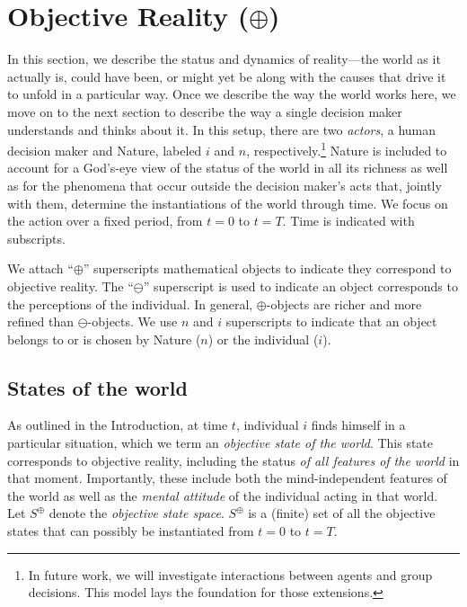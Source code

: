 \documentclass[
11pt,
titlepage,
reqno,
]{article}%
\theoremstyle{definition}
\begin{document}
	
\section{Objective Reality ($\oplus$)}\label{sec:world}
	
In this section, we describe the status and dynamics of reality---the world as it actually is, could have been, or might yet be along with the causes that drive it to unfold in a particular way. 
Once we describe the way the world works here, we move on to the next section to describe the way a single decision maker understands and thinks about it.
In this setup, there are two \textit{actors}, a human decision maker and Nature, labeled $i$ and $n$, respectively.\footnote
{
	In future work, we will investigate interactions between agents and group decisions.
		This model lays the foundation for those extensions.
} 
Nature is included to account for  a God's-eye view of the status of the world in all its richness as well as for the phenomena that occur outside the decision maker's acts that, jointly with them, determine the instantiations of the world through time.
We focus on the action over a fixed period, from $t=0$ to $t=T$. 
Time is indicated with subscripts.
	
We attach ``$\oplus$'' superscripts mathematical objects to indicate they correspond to objective reality.
The ``$\ominus$'' superscript is used to indicate an object corresponds to the perceptions of the individual.
In general, $\oplus$-objects are richer and more refined than $\ominus$-objects. 
We use $n$ and $i$ superscripts to indicate that an object belongs to or is chosen by Nature ($n$) or the individual ($i$).
	
	
	
	
\subsection{States of the world\label{sec:states}}
	
As outlined in the Introduction, at time $t$, individual $i$ finds himself in a particular situation, which we term an \textit{objective state of the world}.
This state corresponds to objective reality, including the status \textit{of all features of the world} in that moment. 
Importantly, these include both the  mind-independent features of the world as well as the \textit{mental attitude} of the individual acting in that world. 
Let $S^\oplus$ denote the \textit{objective state space}.
$S^\oplus$ is a (finite) set of all the objective states  that can possibly be instantiated from $t=0$ to $t=T$.
\end{document}

